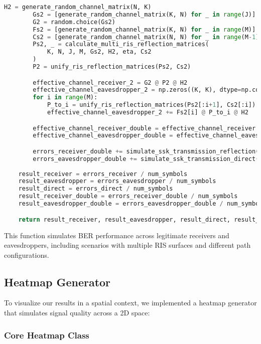 \begin{lstlisting}[language=python, caption={BER Simulation}]
        H2 = generate_random_channel_matrix(N, K)
        Gs2 = [generate_random_channel_matrix(K, N) for _ in range(J)]
        G2 = random.choice(Gs2)
        Fs2 = [generate_random_channel_matrix(K, N) for _ in range(M)]
        Cs2 = [generate_random_channel_matrix(N, N) for _ in range(M-1)]
        Ps2, _ = calculate_multi_ris_reflection_matrices(
            K, N, J, M, Gs2, H2, eta, Cs2
        )
        P2 = unify_ris_reflection_matrices(Ps2, Cs2)

        effective_channel_receiver_2 = G2 @ P2 @ H2
        effective_channel_eavesdropper_2 = np.zeros((K, K), dtype=np.complex128) # F @ P @ H
        for i in range(M):
            P_to_i = unify_ris_reflection_matrices(Ps2[:i+1], Cs2[:i])
            effective_channel_eavesdropper_2 += Fs2[i] @ P_to_i @ H2

        effective_channel_receiver_double = effective_channel_receiver + effective_channel_receiver_2
        effective_channel_eavesdropper_double = effective_channel_eavesdropper + effective_channel_eavesdropper_2

        errors_receiver_double += simulate_ssk_transmission_reflection(K, effective_channel_receiver_double, sigma_sq)
        errors_eavesdropper_double += simulate_ssk_transmission_direct(K, B, effective_channel_eavesdropper_double, sigma_sq)
    
    result_receiver = errors_receiver / num_symbols
    result_eavesdropper = errors_eavesdropper / num_symbols
    result_direct = errors_direct / num_symbols
    result_receiver_double = errors_receiver_double / num_symbols
    result_eavesdropper_double = errors_eavesdropper_double / num_symbols

    return result_receiver, result_eavesdropper, result_direct, result_receiver_double, result_eavesdropper_double
\end{lstlisting}

This function simulates BER performance across legitimate receivers and eavesdroppers, including scenarios with multiple RIS surfaces and different path configurations.

\newpage
\subsection{Heatmap Generator}

To visualize our results in a spatial context, we implemented a heatmap generator that simulates signal quality across a 2D space:

\subsubsection{Core Heatmap Class}

